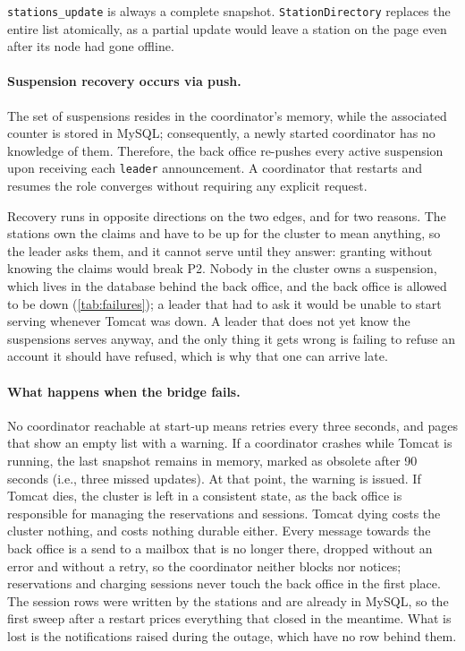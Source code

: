 \texttt{stations\_update} is always a complete snapshot. \texttt{StationDirectory} replaces
the entire list atomically, as a partial update would leave a station on the page even
after its node had gone offline.

\paragraph{Suspension recovery occurs via push.} The set of suspensions resides in the coordinator's
memory, while the associated counter is stored in MySQL; consequently, a newly started coordinator
has no knowledge of them. Therefore, the back office re-pushes every active suspension upon receiving
each \texttt{leader} announcement. A coordinator that restarts and resumes the role converges
without requiring any explicit request.

Recovery runs in opposite directions on the two edges, and for two reasons. The stations own
the claims and have to be up for the cluster to mean anything, so the leader asks them, and
it cannot serve until they answer: granting without knowing the claims would break P2.
Nobody in the cluster owns a suspension, which lives in the database behind the back office,
and the back office is allowed to be down (\cref{tab:failures}); a leader that had to ask it
would be unable to start serving whenever Tomcat was down. A leader that does not yet know
the suspensions serves anyway, and the only thing it gets wrong is failing to refuse an
account it should have refused, which is why that one can arrive late.


\paragraph{What happens when the bridge fails.} No coordinator reachable at start-up means 
retries every three seconds, and pages that show an empty list with a warning. If a coordinator crashes while Tomcat is running,
the last snapshot remains in memory, marked as obsolete after 90 seconds (i.e., three missed updates). At that point, the warning is issued. If Tomcat dies, the cluster is left in a consistent state, as the back office is responsible for managing the reservations and sessions. Tomcat dying costs the cluster nothing,
and costs nothing durable either. Every message towards the back office is a send to a
mailbox that is no longer there, dropped without an error and without a retry, so the
coordinator neither blocks nor notices; reservations and charging sessions never touch the
back office in the first place. The session rows were written by the stations and are
already in MySQL, so the first sweep after a restart prices everything that closed in the
meantime. What is lost is the notifications raised during the outage, which have no row
behind them.
